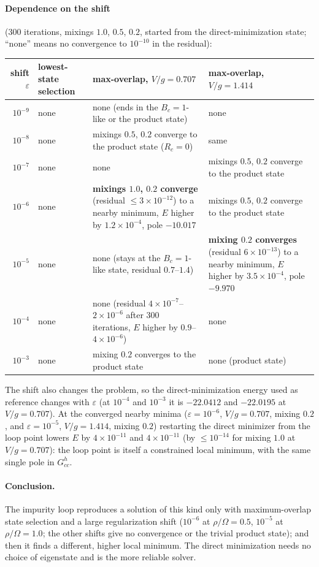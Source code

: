 \documentclass[11pt]{article}
\begin{document}
\paragraph{Dependence on the shift} (300 iterations, mixings $1.0$, $0.5$, $0.2$, started from the direct-minimization state; ``none'' means no convergence to $10^{-10}$ in the residual):
\begin{center}\footnotesize
\begin{tabular}{rp{2.6cm}p{4.6cm}p{4.6cm}}
\toprule
shift $\varepsilon$ & lowest-state selection & max-overlap, $V/g=0.707$ & max-overlap, $V/g=1.414$\\
\midrule
$10^{-9}$ & none & none (ends in the $B_c=1$-like or the product state) & none\\
$10^{-8}$ & none & mixings $0.5$, $0.2$ converge to the product state ($R_c=0$) & same\\
$10^{-7}$ & none & none & mixings $0.5$, $0.2$ converge to the product state\\
$10^{-6}$ & none & \textbf{mixings $1.0$, $0.2$ converge} (residual $\le3\times10^{-12}$) to a nearby minimum, $E$ higher by $1.2\times10^{-4}$, pole $-10.017$ & mixings $0.5$, $0.2$ converge to the product state\\
$10^{-5}$ & none & none (stays at the $B_c=1$-like state, residual $0.7$--$1.4$) & \textbf{mixing $0.2$ converges} (residual $6\times10^{-13}$) to a nearby minimum, $E$ higher by $3.5\times10^{-4}$, pole $-9.970$\\
$10^{-4}$ & none & none (residual $4\times10^{-7}$--$2\times10^{-6}$ after 300 iterations, $E$ higher by $0.9$--$4\times10^{-6}$) & none\\
$10^{-3}$ & none & mixing $0.2$ converges to the product state & none (product state)\\
\bottomrule
\end{tabular}
\end{center}
The shift also changes the problem, so the direct-minimization energy used as reference changes with $\varepsilon$ (at $10^{-4}$ and $10^{-3}$ it is $-22.0412$ and $-22.0195$ at $V/g=0.707$).
At the converged nearby minima ($\varepsilon=10^{-6}$, $V/g=0.707$, mixing $0.2$, and $\varepsilon=10^{-5}$, $V/g=1.414$, mixing $0.2$) restarting the direct minimizer from the loop point lowers $E$ by
$4\times10^{-11}$ and $4\times10^{-11}$ (by $\le10^{-14}$ for mixing $1.0$ at $V/g=0.707$): the loop point is itself a constrained local minimum, with the same single pole in $G^h_{cc}$.

\paragraph{Conclusion.} The impurity loop reproduces a solution of this kind only with maximum-overlap state selection and a large regularization shift ($10^{-6}$ at $\rho/\Omega=0.5$, $10^{-5}$ at $\rho/\Omega=1.0$; the other shifts give no
convergence or the trivial product state); and then it finds a different, higher local minimum. The direct minimization needs no choice of eigenstate and is the more reliable solver.
\end{document}
